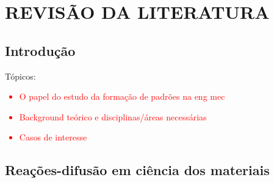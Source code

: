 \chapter{REVISÃO DA LITERATURA}
\label{cap1}
\section{\textbf{Introdução}}

Tópicos:
\textcolor{red}{  
\begin{itemize}
    \item O papel do estudo da formação de padrões na eng mec
    \item Background teórico e disciplinas/áreas necessárias
    \item Casos de interesse
\end{itemize}}

\section{\textbf{Reações-difusão em ciência dos materiais}}




